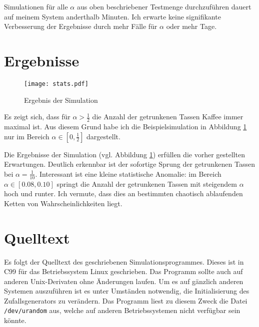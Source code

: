 \documentclass{scrartcl}
\begin{document}
Simulationen für alle $\alpha$ aus oben beschriebener Testmenge durchzuführen
dauert auf meinem System anderthalb Minuten. Ich erwarte keine signifikante
Verbesserung der Ergebnisse durch mehr Fälle für $\alpha$ oder mehr Tage.

\section{Ergebnisse}
\begin{figure}
\begin{center}
\texttt{[image: stats.pdf]}
\end{center}
\caption{Ergebnis der Simulation}
\label{simulation}
\end{figure}

Es zeigt sich, dass für $\alpha>\frac12$ die Anzahl der getrunkenen Tassen
Kaffee immer maximal ist. Aus diesem Grund habe ich die Beispielsimulation
in Abbildung \ref{simulation} nur im Bereich $\alpha\in[0,\frac12]$ dargestellt.

Die Ergebnisse der Simulation (vgl. Abbildung \ref{simulation}) erfüllen die
vorher gestellten Erwartungen. Deutlich erkennbar ist der sofortige Sprung der
getrunkenen Tassen bei $\alpha=\frac1{10}$. Interessant ist eine kleine
statistische Anomalie: im Bereich $\alpha\in[0.08,0.10]$ springt die Anzahl der
getrunkenen Tassen mit steigendem $\alpha$ hoch und runter. Ich vermute, dass
dies an bestimmten chaotisch ablaufenden Ketten von Wahrscheinlichkeiten liegt.

\appendix
\section{Quelltext}
Es folgt der Quelltext des geschriebenen Simulationsprogrammes. Dieses ist in
C99 für das Betriebssystem Linux geschrieben. Das Programm sollte auch auf
anderen Unix-Derivaten ohne Änderungen laufen. Um es auf gänzlich anderen
Systemen auszuführen ist es unter Umständen notwendig, die Initialisierung des
Zufallsgenerators zu verändern. Das Programm liest zu diesem Zweck die Datei
\texttt{/dev/urandom} aus, welche auf anderen Betriebssystemen nicht verfügbar
sein könnte.


\end{document}
